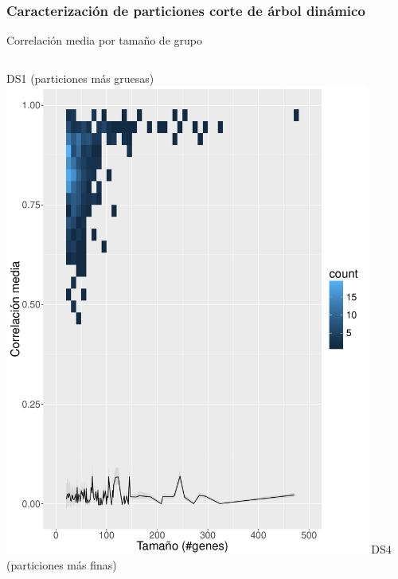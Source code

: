 \documentclass[serif,9pt, t]{beamer}
\begin{document}
\begin{frame}
\begin{columns}[T]
\end{columns}
\end{frame}

\begin{frame}\frametitle{Caracterización de particiones corte de árbol dinámico} 
\centering
Correlación media por tamaño de grupo
\begin{columns}[T]
	\centering
	DS1 (particiones más gruesas)
	\includegraphics[width=0.9\textwidth]{correlacion_media_por_tamano_ds_1.pdf}	
	\centering
	DS4 (particiones más finas)

\end{columns}
\end{frame}
\end{document}
